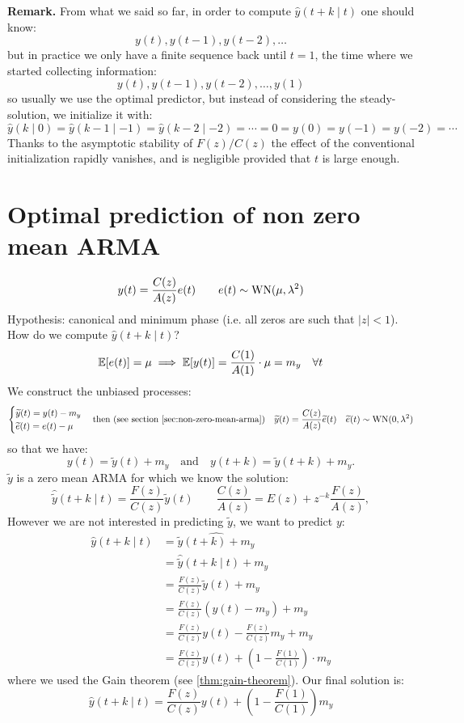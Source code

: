 \textbf{Remark.}
From what we said so far, in order to compute $\hat y(t+k\mid t)$ one should know:
\[
	y(t),y(t-1),y(t-2),\ldots
\]
but in practice we only have a finite sequence back until $t=1$, the time where we started collecting information:
\[
	y(t),y(t-1),y(t-2),\ldots,y(1)
\]
so usually we use the optimal predictor, but instead of considering the steady-solution, we initialize it with:
\[
	\hat y(k\mid 0) = \hat y(k-1\mid -1) = \hat y(k-2\mid -2) = \cdots = 0 = y(0) = y(-1) = y(-2) = \cdots
\]
Thanks to the asymptotic stability of $F(z)/C(z)$ the effect of the conventional initialization rapidly vanishes, and is negligible provided that $t$ is large enough.

\section{Optimal prediction of non zero mean ARMA}
\[
	y(t)=\frac{C(z)}{A(z)}e(t)\qquad e(t)\sim \operatorname{WN}(\mu,\lambda^2 )
\]
Hypothesis: canonical and minimum phase (i.e. all zeros are such that $|z|<1$). How do we compute $\hat y(t+k\mid t)$?
\[
	\mathbb{E}[e(t)] = \mu \implies \mathbb{E}[y(t)]=\frac{C(1)}{A(1)}\cdot\mu=m_{y} \quad \forall t
\]
We construct the unbiased processes:
\[
	\begin{cases}
		\widetilde y(t)=y(t)-m_{y}\\
		\widetilde e(t)=e(t)-\mu
	\end{cases}
	\text{then (see section \ref{sec:non-zero-mean-arma})}
	\quad
	\widetilde y(t)=\frac{C(z)}{A(z)}\widetilde e(t) \quad \widetilde e(t)\sim \operatorname{WN}(0,\lambda^2)
\]
so that we have:
\[
	y(t)=\tilde y(t)+m_{y} \quad\text{and}\quad y(t+k)=\tilde y(t+k)+m_{y}.
\]
$\tilde y$ is a zero mean ARMA for which we know the solution:
\[
	\hat{\tilde y} (t+k\mid t) = \frac{F(z)}{C(z)}\tilde y(t) \qquad \frac{C(z)}{A(z)}=E(z)+z^{-k}\frac{F(z) }{A(z)},
\]
However we are not interested in predicting $\tilde y$, we want to predict $y$:
\begin{align*}
	\hat y(t+k\mid t)&=\widehat{\tilde y(t+k)+m_{y}}\\
	&= \hat{\tilde y}(t+k\mid t)+m_{y}\\
	&=\frac{F(z)}{C(z)}\tilde y(t)+m_{y}\\
	&=\frac{F(z)}{C(z)}(y(t)-m_{y})+m_{y}\\
	&=\frac{F(z)}{C(z)}y(t)-\frac{F(z)}{C(z)}m_{y}+m_{y}\\
	&=\frac{F(z)}{C(z)}y(t)+\left( 1-\frac{F(1)}{C(1)} \right)  \cdot m_{y}
\end{align*}
where we used the Gain theorem (see \ref{thm:gain-theorem}). Our final solution is:
\[
	\boxed{\hat y(t+k\mid t) = \frac{F(z)}{C(z)}y(t)+\left( 1-\frac{F(1)}{C(1)} \right) m_{y}}
\]